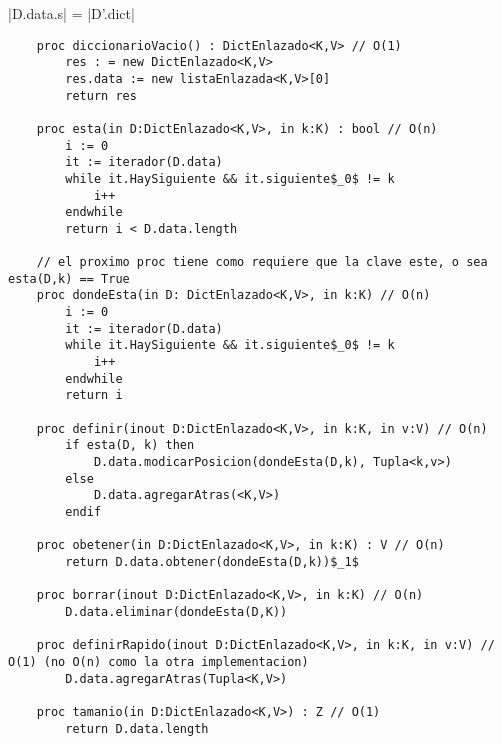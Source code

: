 \documentclass[10pt,a4paper]{article}
\begin{document}
{}

{|D.data.s| = |D'.dict| \land \\
}

\begin{lstlisting}
	proc diccionarioVacio() : DictEnlazado<K,V> // O(1)
		res : = new DictEnlazado<K,V>
		res.data := new listaEnlazada<K,V>[0]
		return res

	proc esta(in D:DictEnlazado<K,V>, in k:K) : bool // O(n)
		i := 0 
		it := iterador(D.data)
		while it.HaySiguiente && it.siguiente$_0$ != k
			i++
		endwhile
		return i < D.data.length

	// el proximo proc tiene como requiere que la clave este, o sea esta(D,k) == True
	proc dondeEsta(in D: DictEnlazado<K,V>, in k:K) // O(n)
		i := 0 
		it := iterador(D.data)
		while it.HaySiguiente && it.siguiente$_0$ != k
			i++
		endwhile
		return i

	proc definir(inout D:DictEnlazado<K,V>, in k:K, in v:V) // O(n)
		if esta(D, k) then
			D.data.modicarPosicion(dondeEsta(D,k), Tupla<k,v>)
		else
			D.data.agregarAtras(<K,V>)
		endif

	proc obetener(in D:DictEnlazado<K,V>, in k:K) : V // O(n)
		return D.data.obtener(dondeEsta(D,k))$_1$

	proc borrar(inout D:DictEnlazado<K,V>, in k:K) // O(n)
		D.data.eliminar(dondeEsta(D,K))

	proc definirRapido(inout D:DictEnlazado<K,V>, in k:K, in v:V) // O(1) (no O(n) como la otra implementacion)
		D.data.agregarAtras(Tupla<K,V>)

	proc tamanio(in D:DictEnlazado<K,V>) : Z // O(1)
		return D.data.length

\end{lstlisting}
\end{document}
